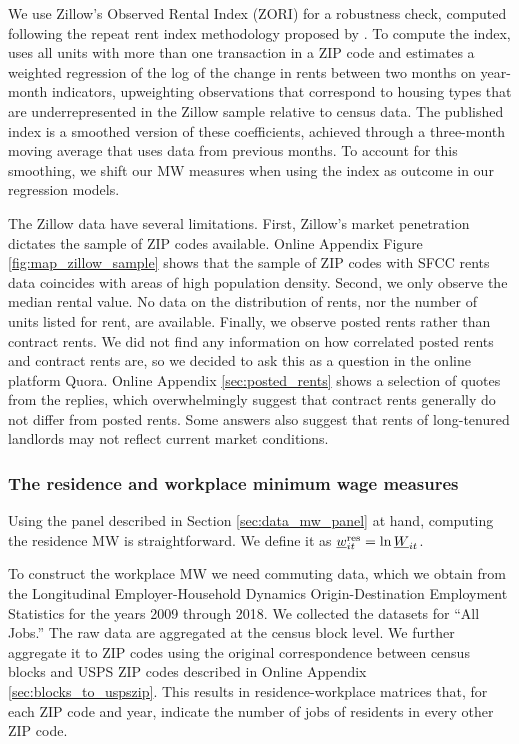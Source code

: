 We use Zillow's Observed Rental Index (ZORI) for a robustness check,
computed following the repeat rent index methodology proposed by 
\textcite{AmbroseEtAl2015}.
To compute the index, \textcite{ZillowZORI} uses all units with more than one 
transaction in a ZIP code and estimates a weighted regression of the 
log of the change in rents between two months on year-month indicators, 
upweighting observations that correspond to housing types that are 
underrepresented in the Zillow sample relative to census data.
The published index is a smoothed version of these coefficients, achieved 
through a three-month moving average that uses data from previous months. 
To account for this smoothing, we shift our MW measures when using the index as 
outcome in our regression models.

The Zillow data have several limitations.
First, Zillow's market penetration dictates the sample of ZIP codes available.
Online Appendix Figure \ref{fig:map_zillow_sample} shows that the sample of ZIP 
codes with SFCC rents data coincides with areas of high population density.
Second, we only observe the median rental value.
No data on the distribution of rents, nor the number of units listed for rent, 
are available.
Finally, we observe posted rents rather than contract rents.
We did not find any information on how correlated posted rents and contract 
rents are, so we decided to ask this as a question in the online platform Quora.
Online Appendix \ref{sec:posted_rents} shows a selection of quotes from the 
replies, which overwhelmingly suggest that contract rents generally do not 
differ from posted rents.
Some answers also suggest that rents of long-tenured landlords may not
reflect current market conditions.

\subsubsection{The residence and workplace minimum wage measures}
\label{sec:data_mw_measures}

Using the panel described in Section \ref{sec:data_mw_panel} at hand, computing 
the residence MW is straightforward.
We define it as $\underline{w}^{\text{res}}_{it} = \ln \underline{W}_{it}$.

To construct the workplace MW we need commuting data, which we obtain from the 
Longitudinal Employer-Household Dynamics Origin-Destination Employment Statistics 
\parencite[LODES;][]{CensusLODES} for the years 2009 through 2018.
We collected the datasets for ``All Jobs.''
The raw data are aggregated at the census block level. 
We further aggregate it to ZIP codes using the original correspondence between 
census blocks and USPS ZIP codes described in Online Appendix 
\ref{sec:blocks_to_uspszip}.
This results in residence-workplace matrices that, for each ZIP code and year, 
indicate the number of jobs of residents in every other ZIP code.

